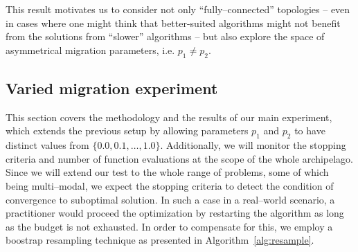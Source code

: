 \documentclass{sig-alternate}
\begin{document}
This result motivates us to consider not only ``fully--connected'' topologies -- even in cases where one might think that better-suited algorithms might not benefit from the solutions from ``slower'' algorithms -- but also explore the space of asymmetrical migration parameters, i.e. $p_1 \neq p_2$.

\subsection{Varied migration experiment}

This section covers the methodology and the results of our main experiment, which extends the previous setup by allowing parameters $p_1$ and $p_2$ to have distinct values from $\{0.0, 0.1, \ldots, 1.0\}$.
Additionally, we will monitor the stopping criteria and number of function evaluations at the scope of the whole archipelago.
Since we will extend our test to the whole range of problems, some of which being multi--modal, we expect the stopping criteria to detect the condition of convergence to suboptimal solution.
In such a case in a real--world scenario, a practitioner would proceed the optimization by restarting the algorithm as long as the budget is not exhausted.
In order to compensate for this, we employ a boostrap resampling technique as presented in Algorithm~\ref{alg:resample}.

\end{document}

